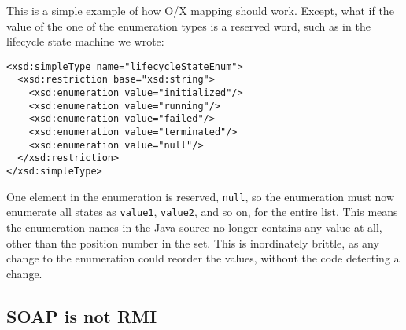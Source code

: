 This is a simple example of how O/X mapping should work. Except, what if the
value of the one of the enumeration types is a reserved word, such as in the
lifecycle state machine we wrote:

\begin{verbatim}
<xsd:simpleType name="lifecycleStateEnum">
  <xsd:restriction base="xsd:string"> 
    <xsd:enumeration value="initialized"/> 
    <xsd:enumeration value="running"/> 
    <xsd:enumeration value="failed"/> 
    <xsd:enumeration value="terminated"/> 
    <xsd:enumeration value="null"/> 
  </xsd:restriction>
</xsd:simpleType>
\end{verbatim}

One element in the enumeration is reserved, \verb|null|, so the
enumeration must now enumerate all states as \verb|value1|,
\verb|value2|, and so on, for the entire list. This means the
enumeration names in the Java source no longer contains any value at
all, other than the position number in the set. This is inordinately
brittle, as any change to the enumeration could reorder the values,
without the code detecting a change.

% 
% 
% 
% 




\subsection{SOAP is not RMI}
\label{soap-not-rmi}

